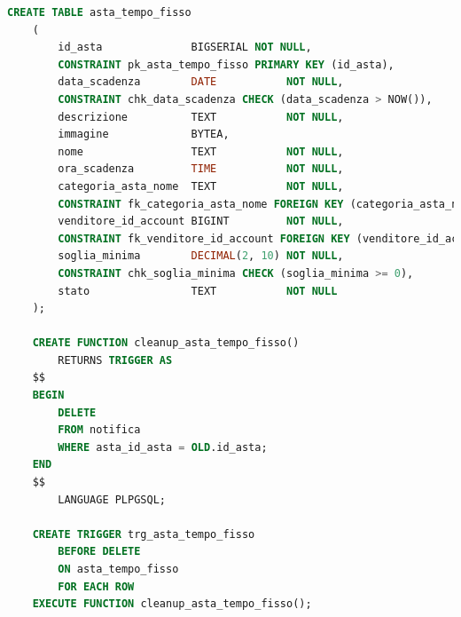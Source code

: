 \begin{lstlisting}[language=SQL, caption=Relazione asta a tempo fisso]
    CREATE TABLE asta_tempo_fisso
    (
        id_asta              BIGSERIAL NOT NULL,
        CONSTRAINT pk_asta_tempo_fisso PRIMARY KEY (id_asta),
        data_scadenza        DATE           NOT NULL,
        CONSTRAINT chk_data_scadenza CHECK (data_scadenza > NOW()),
        descrizione          TEXT           NOT NULL,
        immagine             BYTEA,
        nome                 TEXT           NOT NULL,
        ora_scadenza         TIME           NOT NULL,
        categoria_asta_nome  TEXT           NOT NULL,
        CONSTRAINT fk_categoria_asta_nome FOREIGN KEY (categoria_asta_nome) REFERENCES categoria_asta (nome) ON UPDATE CASCADE ON DELETE CASCADE,
        venditore_id_account BIGINT         NOT NULL,
        CONSTRAINT fk_venditore_id_account FOREIGN KEY (venditore_id_account) REFERENCES venditore (id_account) ON UPDATE CASCADE ON DELETE CASCADE,
        soglia_minima        DECIMAL(2, 10) NOT NULL,
        CONSTRAINT chk_soglia_minima CHECK (soglia_minima >= 0),
        stato                TEXT           NOT NULL
    );
    
    CREATE FUNCTION cleanup_asta_tempo_fisso()
        RETURNS TRIGGER AS
    $$
    BEGIN
        DELETE
        FROM notifica
        WHERE asta_id_asta = OLD.id_asta;
    END
    $$
        LANGUAGE PLPGSQL;
    
    CREATE TRIGGER trg_asta_tempo_fisso
        BEFORE DELETE
        ON asta_tempo_fisso
        FOR EACH ROW
    EXECUTE FUNCTION cleanup_asta_tempo_fisso();
\end{lstlisting}

